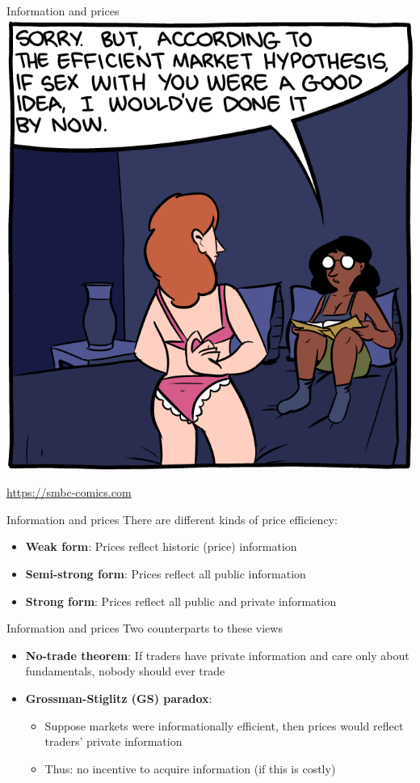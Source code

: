 \begin{frame}{Information and prices}
	\centering
	\includegraphics[scale=0.25]{pics/20140603.png}
	
	\url{https://smbc-comics.com}
\end{frame}


\begin{frame}{Information and prices}
	There are different kinds of price efficiency:
	\begin{itemize}
		\item \textbf{Weak form}: Prices reflect historic (price) information
		\item \textbf{Semi-strong form}: Prices reflect all public information
		\item \textbf{Strong form}: Prices reflect all public and private information
	\end{itemize}
\end{frame}


\begin{frame}{Information and prices}
Two counterparts to these views
\begin{itemize}
	\item \textbf{No-trade theorem}: If traders have private information and care only about fundamentals, nobody should ever trade
	\item \textbf{Grossman-Stiglitz (GS) paradox}: 
	\begin{itemize}
		\item Suppose markets were informationally efficient, then prices would reflect traders' private information
		\item Thus: no incentive to acquire information (if this is costly)
	\end{itemize} 
\end{itemize}
\end{frame}


